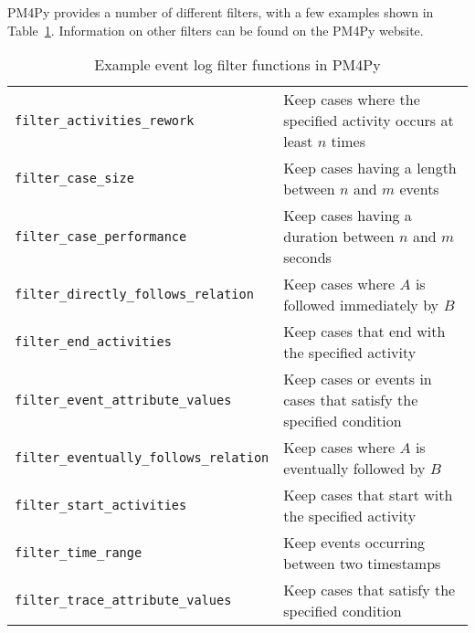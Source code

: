 PM4Py provides a number of different filters, with a few examples shown in Table~\ref{tab:pm4py_filters}. Information on other filters can be found on the PM4Py website.

\begin{table}
\small
\renewcommand{\arraystretch}{1.1}
\begin{tabularx}{\textwidth}{l|X} \hline 
\texttt{filter\_activities\_rework} & Keep cases where the specified activity occurs at least $n$ times \\
\texttt{filter\_case\_size} & Keep cases having a length between $n$ and $m$ events \\
\texttt{filter\_case\_performance} & Keep cases having a duration between $n$ and $m$ seconds \\
\texttt{filter\_directly\_follows\_relation} & Keep cases where $A$ is followed immediately by $B$ \\
\texttt{filter\_end\_activities} & Keep cases that end with the specified activity \\
\texttt{filter\_event\_attribute\_values} & Keep cases or events in cases that satisfy the specified condition \\ 
\texttt{filter\_eventually\_follows\_relation} & Keep cases where $A$ is eventually followed by $B$ \\
\texttt{filter\_start\_activities} & Keep cases that start with the specified activity \\
\texttt{filter\_time\_range} & Keep events occurring between two timestamps \\
\texttt{filter\_trace\_attribute\_values} & Keep cases that satisfy the specified condition \\ \hline
\end{tabularx}
\caption{Example event log filter functions in PM4Py}
\label{tab:pm4py_filters}
\end{table}

